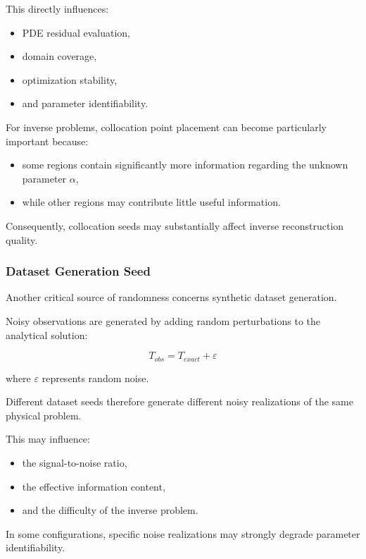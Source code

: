 This directly influences:
\begin{itemize}
    \item PDE residual evaluation,
    \item domain coverage,
    \item optimization stability,
    \item and parameter identifiability.
\end{itemize}

For inverse problems, collocation point placement can become particularly important because:
\begin{itemize}
    \item some regions contain significantly more information regarding the unknown parameter $\alpha$,
    \item while other regions may contribute little useful information.
\end{itemize}

Consequently, collocation seeds may substantially affect inverse reconstruction quality.

\subsubsection{Dataset Generation Seed}

Another critical source of randomness concerns synthetic dataset generation.

Noisy observations are generated by adding random perturbations to the analytical solution:

\begin{equation}
T_{obs}
=
T_{exact}
+
\varepsilon
\end{equation}

where $\varepsilon$ represents random noise.

Different dataset seeds therefore generate different noisy realizations of the same physical problem.

This may influence:
\begin{itemize}
    \item the signal-to-noise ratio,
    \item the effective information content,
    \item and the difficulty of the inverse problem.
\end{itemize}

In some configurations, specific noise realizations may strongly degrade parameter identifiability.

